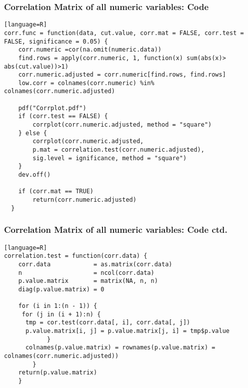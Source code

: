 \begin{frame}[fragile]
\frametitle{Correlation Matrix of all numeric variables: Code}

\begin{lstlisting}[basicstyle=\tiny][language=R]
corr.func = function(data, cut.value, corr.mat = FALSE, corr.test = FALSE, significance = 0.05) {
	corr.numeric =cor(na.omit(numeric.data)) 
	find.rows = apply(corr.numeric, 1, function(x) sum(abs(x)> 					abs(cut.value))>1)
	corr.numeric.adjusted = corr.numeric[find.rows, find.rows]
	low.corr = colnames(corr.numeric) %in%										colnames(corr.numeric.adjusted)

    pdf("Corrplot.pdf")
    if (corr.test == FALSE) {
        corrplot(corr.numeric.adjusted, method = "square")
    } else {
        corrplot(corr.numeric.adjusted, 
        p.mat =	correlation.test(corr.numeric.adjusted),
        sig.level = ignificance, method = "square")
    }
    dev.off()
    
    if (corr.mat == TRUE) 
        return(corr.numeric.adjusted)
  }

\end{lstlisting}

\end{frame}
\begin{frame}[fragile]
\frametitle{Correlation Matrix of all numeric variables: Code ctd.}
\begin{lstlisting}[basicstyle=\tiny][language=R]
correlation.test = function(corr.data) {
    corr.data            = as.matrix(corr.data)
    n                    = ncol(corr.data)
    p.value.matrix       = matrix(NA, n, n)
    diag(p.value.matrix) = 0
    
    for (i in 1:(n - 1)) {
     for (j in (i + 1):n) {
      tmp = cor.test(corr.data[, i], corr.data[, j])            
      p.value.matrix[i, j] = p.value.matrix[j, i] = tmp$p.value 
            }
      colnames(p.value.matrix) = rownames(p.value.matrix) =          		  colnames(corr.numeric.adjusted))
        }
	return(p.value.matrix)
    }
\end{lstlisting}

\end{frame}

